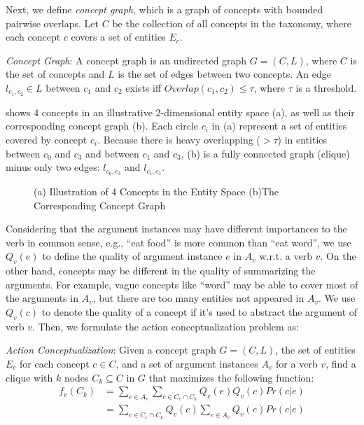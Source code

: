 Next, we define \emph{concept graph}, which is a graph of concepts
with bounded pairwise overlaps.
Let $C$ be the collection of all concepts in the taxonomy,
where each concept $c$ covers a set of entities $E_c$.
\begin{definition}
\emph{Concept Graph}: A concept graph is an
undirected graph $G=(C,L)$, where
$C$ is the set of concepts and $L$ is the set of edges between
two concepts. An edge $l_{c_1,c_2}\in L$ between $c_1$ and $c_2$ exists iff
$Overlap(c_1, c_2)\leq\tau$, where $\tau$ is a threshold.
\end{definition}

 shows 4 concepts in an illustrative 2-dimensional
entity space (a), as well as their corresponding concept graph (b).
Each circle $c_i$ in (a) represent a set of entities covered by concept $c_i$.
Because there is heavy overlapping ($>\tau$) in entities between $c_0$ and $c_3$
and between $c_1$ and $c_3$, (b) is a fully connected graph (clique) minus only
two edges: $l_{c_0,c_3}$ and $l_{c_1, c_3}$.

\begin{figure}[th]
\centering
{}
\caption{(a) Illustration of 4 Concepts in the Entity Space
(b)The Corresponding Concept Graph
}
\label{fig:graph_model}
\end{figure}

Considering that the argument instances may have different 
importances to the verb in common sense, e.g., ``eat food'' is more common than ``eat word'',
we use $Q_v(e)$ to define the quality of argument instance $e$ in $A_v$ w.r.t.
a verb $v$. On the other hand, concepts may be different in the quality of 
summarizing the arguments. For example, vague concepts like ``word'' may be 
able to cover most of the arguments in $A_v$, but there are too many 
entities not appeared in $A_v$. We use $Q_v(c)$ to denote the 
quality of a concept if it's used to abstract the argument of verb $v$.
Then, we formulate the action conceptualization problem as:
\begin{definition}
\emph{Action Conceptualization}: 
Given a concept graph $G=(C,L)$,
the set of entities $E_c$ for each concept $c\in C$,
and a set of argument instances $A_v$ for a verb $v$, find a clique
with $k$ nodes $C_k\subseteq C$
in $G$ that maximizes the following function:
\begin{equation}
\begin{split}
f_v(C_k)&=\sum_{e\in A_v}{\sum_{c\in C_e\cap C_k}{Q_v(e)Q_v(c)Pr(c|e)}} \\
&=\sum_{c\in C_e\cap C_k}{Q_v(c)\sum_{e\in A_v}{Q_v(e)Pr(c|e)}}
\end{split}
\label{eq:objective}
\end{equation}
\end{definition}

